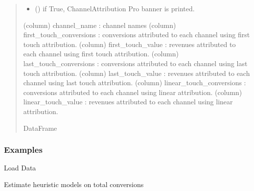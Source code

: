\documentclass[letterpaper,10pt,english]{sphinxmanual}
\begin{document}
\begin{fulllineitems}
\begin{quote}
\begin{description}
\begin{itemize}
\item {} 
\sphinxAtStartPar
{} (\sphinxstyleliteralemphasis{\sphinxupquote{, }}) \textendash{} if True, ChannelAttribution Pro banner is printed.

\end{itemize}

\sphinxAtStartPar
(column) channel\_name : channel names
(column) first\_touch\_conversions : conversions attributed to each channel using first touch attribution.
(column) first\_touch\_value : revenues attributed to each channel using first touch attribution.
(column) last\_touch\_conversions : conversions attributed to each channel using last touch attribution.
(column) last\_touch\_value : revenues attributed to each channel using last touch attribution.
(column) linear\_touch\_conversions : conversions attributed to each channel using linear attribution.
(column) linear\_touch\_value : revenues attributed to each channel using linear attribution.

\sphinxAtStartPar
DataFrame

\end{description}\end{quote}
\subsubsection*{Examples}

\sphinxAtStartPar
Load Data

\begin{sphinxVerbatim}[commandchars=\\\{\}]
 
  
\end{sphinxVerbatim}

\sphinxAtStartPar
Estimate heuristic models on total conversions


\end{fulllineitems}
\end{document}
